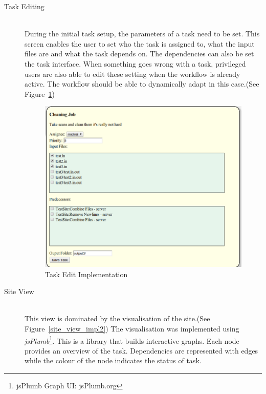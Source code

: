 \begin{description}
\item[Task Editing] \hfill \\
    During the initial task setup, the parameters of a task need to be set. This screen enables
    the user to set who the task is assigned to, what the input files are and what the task
    depends on. The dependencies can also be set the task interface.
    When something goes wrong with a task, privileged users are also able to edit these setting
    when the workflow is already active. The workflow should be able to dynamically adapt in this case.(See Figure~\ref{task_edit_impl2})
    \begin{figure}[!h]
        \begin{center}
            \includegraphics[scale=0.35]{figures/task_edit_impl2.png}
        \end{center}
        \caption{Task Edit Implementation}
        \label{task_edit_impl2}
    \end{figure}
\item[Site View] \hfill \\
    This view is dominated by the visualisation of the site.(See Figure~\ref{site_view_impl2}) The visualisation
    was implemented using \emph{jsPlumb}\footnote{jsPlumb Graph UI:
    jsPlumb.org}. This is a library that builds interactive graphs. Each node
    provides an overview of the task. Dependencies are represented with edges
    while the colour of the node indicates the status of task.
    \begin{figure}[!h]
        \begin{center}

\end{center}
\end{figure}
\end{description}
